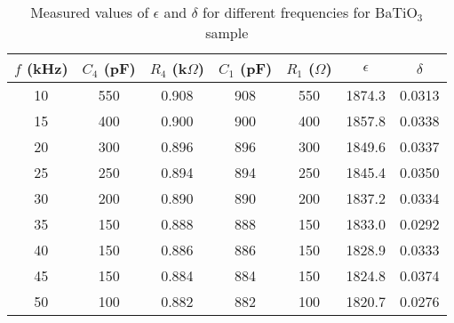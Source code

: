 \begin{table}[H]
    \centering
    \begin{tabular}{|c|c|c|c|c|c|c|}
    \hline
    $f$ (kHz) & $C_4$ (pF) & $R_4$ (k$\Omega$) & $C_1$ (pF) & $R_1$ ($\Omega$) & $\epsilon$ & $\delta$ \\ \hline
    10 & 550 & 0.908 & 908 & 550 & 1874.3 & 0.0313 \\ \hline
    15 & 400 & 0.900 & 900 & 400 & 1857.8 & 0.0338 \\ \hline
    20 & 300 & 0.896 & 896 & 300 & 1849.6 & 0.0337 \\ \hline
    25 & 250 & 0.894 & 894 & 250 & 1845.4 & 0.0350 \\ \hline
    30 & 200 & 0.890 & 890 & 200 & 1837.2 & 0.0334 \\ \hline
    35 & 150 & 0.888 & 888 & 150 & 1833.0 & 0.0292 \\ \hline
    40 & 150 & 0.886 & 886 & 150 & 1828.9 & 0.0333 \\ \hline
    45 & 150 & 0.884 & 884 & 150 & 1824.8 & 0.0374 \\ \hline
    50 & 100 & 0.882 & 882 & 100 & 1820.7 & 0.0276 \\ \hline
    \end{tabular}
    \caption{Measured values of $\epsilon$ and $\delta$ for different frequencies for BaTiO$_3$ sample}
    \label{tab:a}
\end{table}